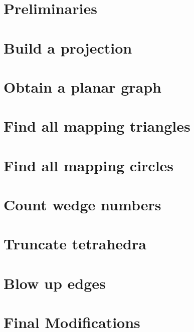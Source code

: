 \label{cha:alg1}



\section{Preliminaries}


\section{Build a projection}


\section{Obtain a planar graph}


%

%

\section{Find all mapping triangles}


\section{Find all mapping circles}


\section{Count wedge numbers}


\section{Truncate tetrahedra}


\section{Blow up edges}


\section{Final Modifications}

